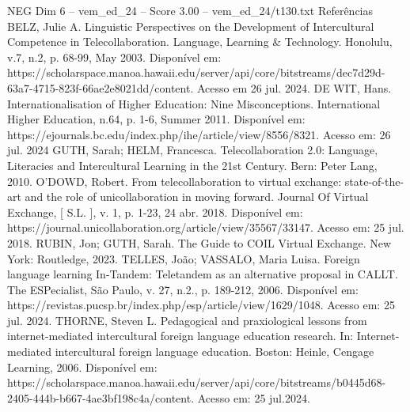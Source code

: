 \begin{textsample}{NEG Dim 6 – vem\_ed\_24 – Score 3.00 – vem\_ed\_24/t130.txt}
Referências BELZ, Julie A.
Linguistic Perspectives on the Development of Intercultural Competence in Telecollaboration.
Language, Learning \& Technology.
Honolulu, v.7, n.2, p. 68-99, May 2003.
Disponível em: https://scholarspace.manoa.hawaii.edu/server/api/core/bitstreams/dec7d29d-63a7-4715-823f-66ae2e8021dd/content.
Acesso em 26 jul. 2024.
DE WIT, Hans.
Internationalisation of Higher Education: Nine Misconceptions.
International Higher Education, n.64, p. 1-6, Summer 2011.
Disponível em: https://ejournals.bc.edu/index.php/ihe/article/view/8556/8321.
Acesso em: 26 jul. 2024 GUTH, Sarah; HELM, Francesca.
Telecollaboration 2.0: Language, Literacies and Intercultural Learning in the 21st Century.
Bern: Peter Lang, 2010.
O'DOWD, Robert.
From telecollaboration to virtual exchange: state-of-the-art and the role of unicollaboration in moving forward.
Journal Of Virtual Exchange, [ S.L. ], v. 1, p. 1-23, 24 abr. 2018.
Disponível em: https://journal.unicollaboration.org/article/view/35567/33147.
Acesso em: 25 jul. 2018.
RUBIN, Jon; GUTH, Sarah.
The Guide to COIL Virtual Exchange.
New York: Routledge, 2023.
TELLES, João; VASSALO, Maria Luisa.
Foreign language learning In-Tandem: Teletandem as an alternative proposal in CALLT.
The ESPecialist, São Paulo, v. 27, n.2., p. 189-212, 2006.
Disponível em: https://revistas.pucsp.br/index.php/esp/article/view/1629/1048.
Acesso em: 25 jul. 2024.
THORNE, Steven L.
Pedagogical and praxiological lessons from internet-mediated intercultural foreign language education research.
In: Internet-mediated intercultural foreign language education.
Boston: Heinle, Cengage Learning, 2006.
Disponível em: https://scholarspace.manoa.hawaii.edu/server/api/core/bitstreams/b0445d68-2405-444b-b667-4ae3bf198c4a/content.
Acesso em: 25 jul.2024.

\end{textsample}
